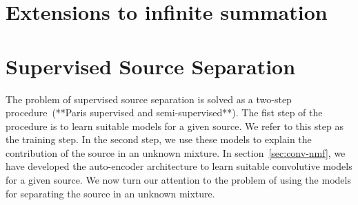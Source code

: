 \documentclass{article}
\begin{document}



\section{Extensions to infinite summation}
\label{sec:rnncnn}







\section{Supervised Source Separation}
\label{sec:ss}
The problem of supervised source separation is solved as a two-step procedure~\cite{}(**Paris supervised and semi-supervised**). The fist step of the procedure is to learn suitable models for a given source. We refer to this step as the training step. In the second step, we use these models to explain the contribution of the source in an unknown mixture. In section~\ref{sec:conv-nmf}, we have developed the auto-encoder architecture to learn suitable convolutive models for a given source. We now turn our attention to the problem of using the models for separating the source in an unknown mixture.
\end{document}
